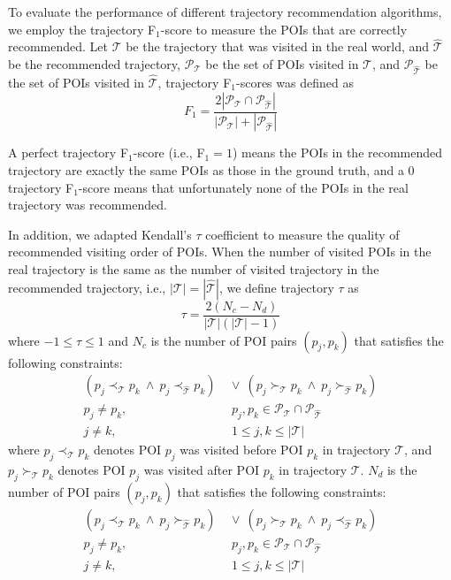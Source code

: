 To evaluate the performance of different trajectory recommendation algorithms,
we employ the trajectory F$_1$-score\cite{ijcai15} to measure the POIs that are 
correctly recommended. Let $\mathcal{T}$ be the trajectory that was visited in the real world,
and $\hat{\mathcal{T}}$ be the recommended trajectory,
$\mathcal{P}_{\mathcal{T}}$ be the set of POIs visited in $\mathcal{T}$,
and $\mathcal{P}_{\hat{\mathcal{T}}}$ be the set of POIs visited in $\hat{\mathcal{T}}$,
trajectory F$_1$-scores was defined as
\begin{displaymath}
    F_1 = \frac{2 |\mathcal{P}_{\mathcal{T}} \cap \mathcal{P}_{\hat{\mathcal{T}}}|}
               {|\mathcal{P}_{\mathcal{T}}| + |\mathcal{P}_{\hat{\mathcal{T}}}|}
\end{displaymath}

A perfect trajectory F$_1$-score (i.e., F$_1 = 1$) means the POIs in the recommended trajectory are exactly 
the same POIs as those in the ground truth, and a $0$ trajectory F$_1$-score means that unfortunately none of 
the POIs in the real trajectory was recommended.

In addition, we adapted Kendall's $\tau$ coefficient \cite{kendalltau} to measure the quality of 
recommended visiting order of POIs.
When the number of visited POIs in the real trajectory is the same
as the number of visited trajectory in the recommended trajectory,
i.e., $|\mathcal{T}| = |\hat{\mathcal{T}}|$,
we define trajectory $\tau$ as 
\begin{displaymath}
    \tau = \frac{2(N_c - N_d)}{|\mathcal{T}|(|\mathcal{T}|-1)}
\end{displaymath}
where $-1 \le \tau \le 1$ and $N_c$ is the number of POI pairs $(p_j, p_k)$ that satisfies the following constraints:
\begin{align*}
    (p_j \prec_{\mathcal{T}} p_k ~\land~ p_j \prec_{\hat{\mathcal{T}}} p_k) & ~\lor~
    (p_j \succ_{\mathcal{T}} p_k ~\land~ p_j \succ_{\hat{\mathcal{T}}} p_k) \\
    p_j \ne p_k, &~~ p_j, p_k \in \mathcal{P}_{\mathcal{T}} \cap \mathcal{P}_{\hat{\mathcal{T}}} \\
    j \ne k, &~~ 1 \le j, k \le |\mathcal{T}|
\end{align*}
where $p_j \prec_{\mathcal{T}} p_k$ denotes POI $p_j$ was visited before POI $p_k$ in trajectory $\mathcal{T}$,
and $p_j \succ_{\mathcal{T}} p_k$ denotes POI $p_j$ was visited after POI $p_k$ in trajectory $\mathcal{T}$.
$N_d$ is the number of POI pairs $(p_j, p_k)$ that satisfies the following constraints:
\begin{align*}
    (p_j \prec_{\mathcal{T}} p_k ~\land~ p_j \succ_{\hat{\mathcal{T}}} p_k) & ~\lor~
    (p_j \succ_{\mathcal{T}} p_k ~\land~ p_j \prec_{\hat{\mathcal{T}}} p_k) \\
    p_j \ne p_k, &~~ p_j, p_k \in \mathcal{P}_{\mathcal{T}} \cap \mathcal{P}_{\hat{\mathcal{T}}} \\
    j \ne k, &~~ 1 \le j, k \le |\mathcal{T}|
\end{align*}

